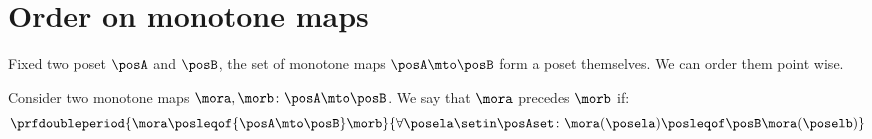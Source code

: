 \section{Order on monotone maps}

Fixed two poset $\posA$ and $\posB$, the set of monotone maps $\posA \mto \posB$ form a poset themselves.
We can order them point wise.

\begin{definition}
    \label{def:order-monotone-maps}
    Consider two monotone maps $\mora,\morb\colon\posA\mto\posB$.
    We say that $\mora$ precedes $\morb$ if:
    \begin{equation}
        \prfdoubleperiod{
            \mora \posleqof{\posA\mto\posB} \morb
        }{
            \forall \posela\setin\posAset \colon \mora(\posela) \posleqof\posB \mora(\poselb)
        }
    \end{equation}
\end{definition}

